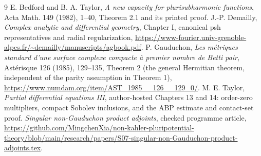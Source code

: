 \documentclass[11pt]{article}
\theoremstyle{remark}
\begin{document}
\begin{thebibliography}{9}
 E. Bedford and B. A. Taylor,
\emph{A new capacity for plurisubharmonic functions},
Acta Math. 149 (1982), 1--40, Theorem 2.1 and its printed proof.
 J.-P. Demailly, \emph{Complex analytic and differential geometry},
Chapter I, canonical psh representatives and radial regularization,
\url{https://www-fourier.univ-grenoble-alpes.fr/~demailly/manuscripts/agbook.pdf}.
 P. Gauduchon,
\emph{Les m\'etriques standard d'une surface complexe compacte \`a
premier nombre de Betti pair}, Ast\'erisque 126 (1985), 129--135,
Theorem 2 (the general Hermitian theorem, independent of the parity
assumption in Theorem 1),
\url{https://www.numdam.org/item/AST_1985__126__129_0/}.
 M. E. Taylor, \emph{Partial differential equations III},
author-hosted Chapters 13 and 14: order-zero multipliers, compact Sobolev
inclusions, and the ABP estimate and contact-set proof.
 \emph{Singular non-Gauduchon product adjoints},
checked programme article,
\url{https://github.com/MingchenXia/non-kahler-pluripotential-theory/blob/main/research/papers/S07-singular-non-Gauduchon-product-adjoints.tex}.
\end{thebibliography}
\end{document}
